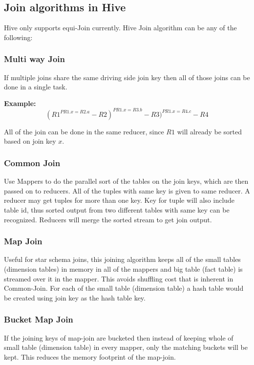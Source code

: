 \documentclass{vldb}
\begin{document}
\subsection{Join algorithms in Hive}
Hive only supports equi-Join currently. Hive Join algorithm can be any of the following:

\subsubsection*{Multi way Join}
If multiple joins share the same driving side join key then all of those joins can be done in a single task.

\noindent
\textbf{Example: }
$$(R1^{PR1.x=R2.a} - R2)^{PR1.x=R3.b} - R3)^{PR1.x=R4.c} - R4$$

All of the join can be done in the same reducer, since $R1$ will already be sorted based on join key $x$.

\subsubsection*{Common Join}
Use Mappers to do the parallel sort of the tables on the join keys, which are then passed on to reducers. All of the tuples with same key is given to same reducer. A reducer may get tuples for more than one key. Key for tuple will also include table id, thus sorted output from two different tables with same key can be recognized. Reducers will merge the sorted stream to get join output.

\subsubsection*{Map Join}
Useful for star schema joins, this joining algorithm keeps all of the small tables (dimension tables) in memory in all of the mappers and big table (fact table) is streamed over it in the mapper. This avoids shuffling cost that is inherent in Common-Join. For each of the small table (dimension table) a hash table would be created using join key as the hash table key.

\subsubsection*{Bucket Map Join}
If the joining keys of map-join are bucketed then instead of keeping whole of small table (dimension table) in every mapper, only the matching buckets will be kept. This reduces the memory footprint of the map-join.
\end{document}
